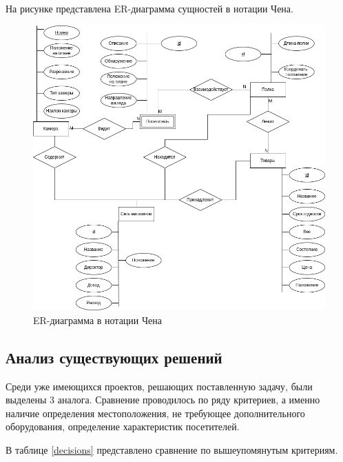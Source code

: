 На рисунке представлена ER-диаграмма сущностей в нотации Чена.

\begin{figure}[ht!]
	\centering
	\includegraphics[width=0.9\linewidth]{assets/images/ER.drawio.png}
	\caption{ER-диаграмма в нотации Чена}
	\label{fig:anal:chen}
\end{figure}
\FloatBarrier

\subsection{Анализ существующих решений}

Среди уже имеющихся проектов, решающих поставленную задачу, были выделены 3 аналога.
Сравнение проводилось по ряду критериев, а именно наличие определения местоположения, 
не требующее дополнительного оборудования, определение характеристик посетителей.

В таблице \ref{decisions} представлено сравнение по вышеупомянутым критериям.

